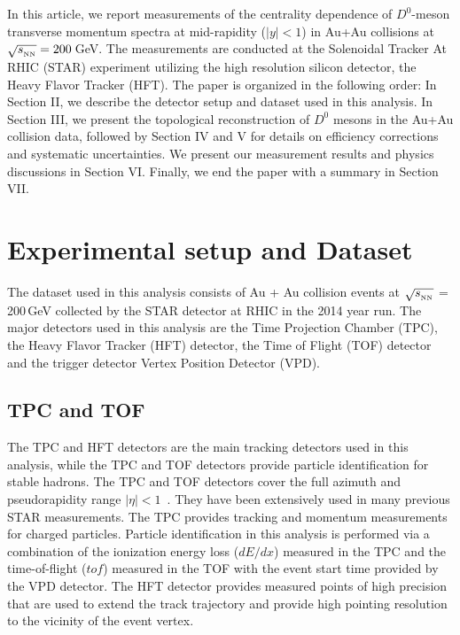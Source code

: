 \documentclass[%
 reprint,	
 amsmath,amssymb,
 aps,
 prc,
]{revtex4-1}
\begin{document}
In this article, we report measurements of the centrality dependence of $D^0$-meson transverse momentum spectra at mid-rapidity ($|y|<1$) in Au+Au collisions at $\sqrt{s_{_{\rm NN}}} = 200$\,GeV. The measurements are conducted at the Solenoidal Tracker At RHIC (STAR) experiment utilizing the high resolution silicon detector, the Heavy Flavor Tracker (HFT). The paper is organized in the following order: In Section II, we describe the detector setup and dataset used in this analysis. In Section III, we present the topological reconstruction of $D^0$ mesons in the Au+Au collision data, followed by Section IV and V for details on efficiency corrections and systematic uncertainties. We present our measurement results and physics discussions in Section VI. Finally, we end the paper with a summary in Section VII.

\section{\label{sec:dataset}Experimental setup and Dataset}
The dataset used in this analysis consists of Au + Au collision events at $\sqrt{s_{_{\rm NN}}}$ = 200\,GeV collected by the STAR detector at RHIC in the 2014 year run. The major detectors used in this analysis are the Time Projection Chamber (TPC), the Heavy Flavor Tracker (HFT) detector, the Time of Flight (TOF) detector and the trigger detector Vertex Position Detector (VPD). 

\subsection{\label{sec:dataset:tpctof}TPC and TOF}
The TPC and HFT detectors are the main tracking detectors used in this analysis, while the TPC and TOF detectors provide particle identification for stable hadrons. The TPC and TOF detectors cover the full azimuth and pseudorapidity range $|\eta|<1$~\cite{TPC,TOF}. They have been extensively used in many previous STAR measurements. The TPC provides tracking and momentum measurements for charged particles. Particle identification in this analysis is performed via a combination of the ionization energy loss ($dE/dx$) measured in the TPC and the time-of-flight ($tof$) measured in the TOF with the event start time provided by the VPD detector. The HFT detector provides measured points of high precision that are used to extend the track trajectory and provide high pointing resolution to the vicinity of the event vertex.
\end{document}
